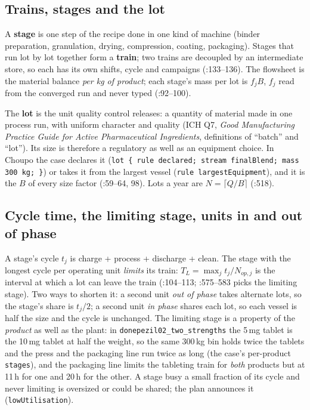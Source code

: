 \documentclass[11pt,a4paper]{article}
\begin{document}
\subsection{Trains, stages and the lot}\label{mp-trains-stages-lot}

A \textbf{stage} is one step of the recipe done in one kind of machine
(binder preparation, granulation, drying, compression, coating,
packaging). Stages that run lot by lot together form a \textbf{train};
two trains are decoupled by an intermediate store, so each has its own
shifts, cycle and campaigns (:133--136). The
flowsheet is the material balance \emph{per kg of product}; each stage's
mass per lot is $f_j B$, $f_j$ read from the converged run and never
typed (:92--100).

The \textbf{lot} is the unit quality control releases: a quantity of
material made in one process run, with uniform character and quality
(ICH Q7, \emph{Good Manufacturing Practice Guide for Active
Pharmaceutical Ingredients}, definitions of ``batch'' and ``lot'').
Its size is therefore a regulatory as well as an equipment choice. In
Choupo the case declares it (\texttt{lot \{ rule declared; stream
finalBlend; mass 300 kg; \}}) or takes it from the largest vessel
(\texttt{rule largestEquipment}), and it is the $B$ of every size
factor (:59--64, 98). Lots a year are $N = \lceil Q /
B \rceil$ (:518).

\subsection{Cycle time, the limiting stage, units in and out of
phase}\label{mp-cycle-limiting}

A stage's cycle $t_j$ is charge + process + discharge + clean. The
stage with the longest cycle per operating unit \emph{limits} its
train: $T_L = \max_j t_j / N_{op,j}$ is the interval at which a lot can
leave the train (:104--113;
:575--583 picks the limiting stage). Two ways to
shorten it: a second unit \emph{out of phase} takes alternate lots, so
the stage's share is $t_j/2$; a second unit \emph{in phase} shares each
lot, so each vessel is half the size and the cycle is unchanged. The
limiting stage is a property of the \emph{product} as well as the plant:
in \texttt{donepezil02\_two\_strengths} the 5\,mg tablet is the 10\,mg
tablet at half the weight, so the same 300\,kg bin holds twice the
tablets and the press and the packaging line run twice as long (the
case's per-product \texttt{stages}), and the packaging line limits the
tableting train for \emph{both} products but at 11\,h for one and 20\,h
for the other. A stage busy a small fraction of its cycle and never
limiting is oversized or could be shared; the plan announces it
(\texttt{lowUtilisation}).
\end{document}
